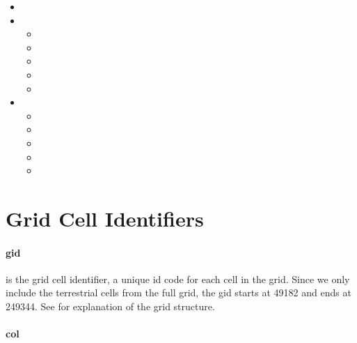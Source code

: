 \documentclass[]{book}
\begin{document}
\begin{itemize}
\itemsep1pt\parskip0pt
\item
\item

  \begin{itemize}
  \itemsep1pt\parskip0pt
  \item
  \item
  \item
  \item
  \item
  \end{itemize}
\item

  \begin{itemize}
  \itemsep1pt\parskip0pt
  \item
  \item
  \item
  \item
  \item
  \end{itemize}
\end{itemize}

\section{Grid Cell Identifiers}\label{grid-cell-identifiers}

\paragraph{gid}\label{gid}

is the grid cell identifier, a unique id code for each cell in the grid.
Since we only include the terrestrial cells from the full grid, the gid
starts at 49182 and ends at 249344. See  for explanation of the grid structure.

\paragraph{col}\label{col}
\end{document}
